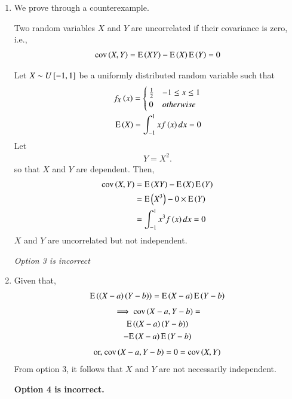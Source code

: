 \begin{enumerate}
{\em Option 2 is correct}.
\item  We prove through a counterexample.
\begin{definition}
    Two random variables $X$ and $Y$ are uncorrelated if their covariance is zero, i.e., 
    \begin{align}
        \text{cov}\left({X}, {Y} \right)=\text{E}\left( XY \right)-\text{E}\left( X \right)\text{E}\left( Y \right)=0
    \end{align}
\end{definition}
    Let $X\sim U {}\left[-1,1\right]$ be a uniformly distributed random variable such that 
    \begin{align}
        f_X\left(x\right)=
        \begin{cases}
        \frac{1}{2} & -1\leq x \leq 1\\
        0 & otherwise
        \end{cases}\\
        \text{E}\left( X \right)=\int_{-1}^{1}x f\left(x\right) dx=0
    \end{align}
    Let 
    \begin{align}
        Y=X^2.
    \end{align}
   so that  $X$ and $Y$ are dependent.  Then, 
    \begin{align}
        \text{cov}\left({X}, {Y} \right)&=\text{E}\left( XY \right)-\text{E}\left( X \right)\text{E}\left( Y \right)\\
        &=\text{E}\left( X^3 \right)-0\times \text{E}\left( Y \right)\\
        &=\int_{-1}^{1}x^3 f\left(x\right) dx=0
    \end{align}
    $X$ and $Y$ are uncorrelated but not independent.
    
    {\em Option 3 is incorrect}
    
    \item Given that,
    \begin{align}
        \text{E}\left( \left(X-a\right)\left(Y-b\right) \right)=\text{E}\left( X-a \right)\text{E}\left( Y-b \right)
    \end{align}
    \begin{multline}
    \implies     \text{cov}\left({X-a}, {Y-b} \right)=
    \\
        \text{E}\left( \left(X-a\right)\left(Y-b\right) \right)\\-\text{E}\left( X-a \right)\text{E}\left( Y-b \right)
    \end{multline}
    \begin{align}
        \text{or, } \text{cov}\left({X-a}, {Y-b} \right)=0=\text{cov}\left({X}, {Y} \right)
    \end{align}
    From option 3, it follows that $X$ and $Y$ are not necessarily independent.
    
    \textbf{Option 4 is incorrect.}
\end{enumerate}
